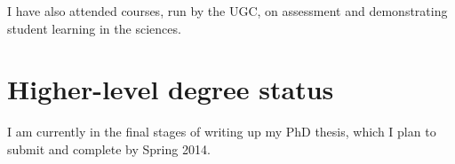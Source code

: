 \documentclass[10pt,a4paper]{article}
\begin{document}
I have also attended courses, run by the UGC, on assessment and demonstrating student learning in the sciences.

\section*{Higher-level degree status}
I am currently in the final stages of writing up my PhD thesis, which I plan to submit and complete by Spring 2014.
\end{document}
